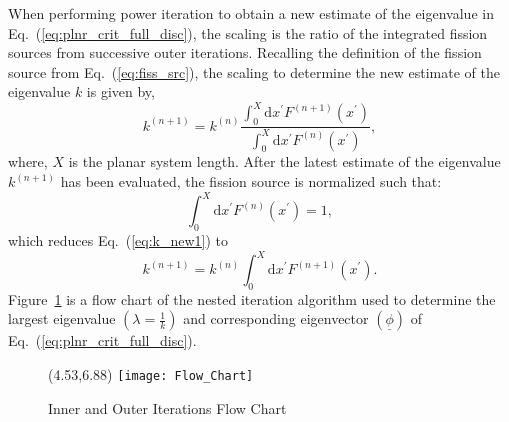 \noindent 
	\indent When performing power iteration to obtain a new estimate of the eigenvalue in
	Eq.~(\ref{eq:plnr_crit_full_disc}), the scaling is the ratio of the integrated fission sources
	from successive outer iterations.  Recalling the definition of the fission source from
	Eq.~(\ref{eq:fiss_src}), the scaling to determine the new estimate of the eigenvalue ${k}$
	is given by,
	\begin{equation}
		{k}^{\left({n+1}\right)} ={k}^{\left({n}\right)} \frac{\int_{0}^{X}{\mathrm{d}{x^{'}}
		{F}^{\left({n+1}\right)}{(x^{'})}}}
		{\int_{0}^{X}{\mathrm{d}{x^{'}}{F}^{\left({n}\right)}{(x^{'})}}},
	\label{eq:k_new1}
	\end{equation}
	where, ${X}$ is the planar system length.  After the latest estimate of the eigenvalue
	${k^{\left({n+1}\right)}}$ has been evaluated, the fission source is normalized such that:
	\begin{equation}
		{\int_{0}^{X}{\mathrm{d}{x^{'}}{F}^{\left({n}\right)}{(x^{'})}}}=1,
	\end{equation}
	which reduces Eq.~(\ref{eq:k_new1}) to
	\begin{equation}
		{k}^{\left({n+1}\right)} ={k}^{\left({n}\right)}\int_{0}^{X}{\mathrm{d}{x^{'}}
		{F}^{\left({n+1}\right)}{(x^{'})}}.
	\label{eq:k_new2}
	\end{equation}
\noindent
	\indent  Figure~\ref{fig:Flow-Chart} is a flow chart of the nested iteration algorithm used to
	determine the largest eigenvalue ${\left({\lambda=\frac{1}{k}}\right)}$ and corresponding 
	eigenvector ${\left({\underline{\phi}}\right)}$ of Eq.~(\ref{eq:plnr_crit_full_disc}).
	\begin{figure}[htbp]
		\begin{center}
			\begin{minipage}[t]{4.53in}
			\begin{picture}(4.53,6.88)
	            	{\texttt{[image: Flow\_Chart]}}
			\end{picture}
			\caption{\label{fig:Flow-Chart} Inner and Outer Iterations Flow Chart}
			\end{minipage} %
		\end{center}
	\end{figure}	
	\vspace{-0.25in}
